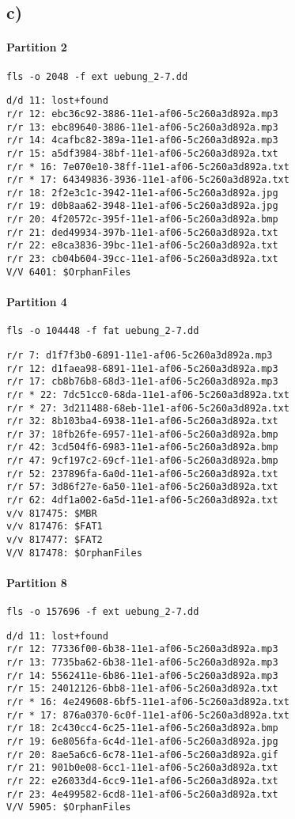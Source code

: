 \documentclass[10pt,a4paper]{article}
\begin{document}
\subsection{c)}
\paragraph{Partition 2}
\Verb+fls -o 2048 -f ext uebung_2-7.dd+
\begin{lstlisting}
d/d 11: lost+found
r/r 12: ebc36c92-3886-11e1-af06-5c260a3d892a.mp3
r/r 13: ebc89640-3886-11e1-af06-5c260a3d892a.mp3
r/r 14: 4cafbc82-389a-11e1-af06-5c260a3d892a.mp3
r/r 15: a5df3984-38bf-11e1-af06-5c260a3d892a.txt
r/r * 16: 7e070e10-38ff-11e1-af06-5c260a3d892a.txt
r/r * 17: 64349836-3936-11e1-af06-5c260a3d892a.txt
r/r 18: 2f2e3c1c-3942-11e1-af06-5c260a3d892a.jpg
r/r 19: d0b8aa62-3948-11e1-af06-5c260a3d892a.jpg
r/r 20: 4f20572c-395f-11e1-af06-5c260a3d892a.bmp
r/r 21: ded49934-397b-11e1-af06-5c260a3d892a.txt
r/r 22: e8ca3836-39bc-11e1-af06-5c260a3d892a.txt
r/r 23: cb04b604-39cc-11e1-af06-5c260a3d892a.txt
V/V 6401: $OrphanFiles
\end{lstlisting}
\paragraph{Partition 4}
\Verb+fls -o 104448 -f fat uebung_2-7.dd+
\begin{lstlisting}
r/r 7: d1f7f3b0-6891-11e1-af06-5c260a3d892a.mp3
r/r 12: d1faea98-6891-11e1-af06-5c260a3d892a.mp3
r/r 17: cb8b76b8-68d3-11e1-af06-5c260a3d892a.mp3
r/r * 22: 7dc51cc0-68da-11e1-af06-5c260a3d892a.txt
r/r * 27: 3d211488-68eb-11e1-af06-5c260a3d892a.txt
r/r 32: 8b103ba4-6938-11e1-af06-5c260a3d892a.txt
r/r 37: 18fb26fe-6957-11e1-af06-5c260a3d892a.bmp
r/r 42: 3cd504f6-6983-11e1-af06-5c260a3d892a.bmp
r/r 47: 9cf197c2-69cf-11e1-af06-5c260a3d892a.bmp
r/r 52: 237896fa-6a0d-11e1-af06-5c260a3d892a.txt
r/r 57: 3d86f27e-6a50-11e1-af06-5c260a3d892a.txt
r/r 62: 4df1a002-6a5d-11e1-af06-5c260a3d892a.txt
v/v 817475: $MBR
v/v 817476: $FAT1
v/v 817477: $FAT2
V/V 817478: $OrphanFiles
\end{lstlisting}
\paragraph{Partition 8}
\Verb+fls -o 157696 -f ext uebung_2-7.dd+
\begin{lstlisting}
d/d 11: lost+found
r/r 12: 77336f00-6b38-11e1-af06-5c260a3d892a.mp3
r/r 13: 7735ba62-6b38-11e1-af06-5c260a3d892a.mp3
r/r 14: 5562411e-6b86-11e1-af06-5c260a3d892a.mp3
r/r 15: 24012126-6bb8-11e1-af06-5c260a3d892a.txt
r/r * 16: 4e249608-6bf5-11e1-af06-5c260a3d892a.txt
r/r * 17: 876a0370-6c0f-11e1-af06-5c260a3d892a.txt
r/r 18: 2c430cc4-6c25-11e1-af06-5c260a3d892a.bmp
r/r 19: 6e8056fa-6c4d-11e1-af06-5c260a3d892a.jpg
r/r 20: 8ae5a6c6-6c78-11e1-af06-5c260a3d892a.gif
r/r 21: 901b0e08-6cc1-11e1-af06-5c260a3d892a.txt
r/r 22: e26033d4-6cc9-11e1-af06-5c260a3d892a.txt
r/r 23: 4e499582-6cd8-11e1-af06-5c260a3d892a.txt
V/V 5905: $OrphanFiles
\end{lstlisting}
\end{document}
